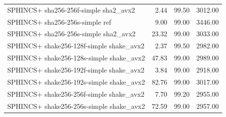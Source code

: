 \begin{tabular}{lrrr}
   SPHINCS+ sha256-256f-simple sha2_avx2 &                           2.44 &        99.50 &                            3012.00 \\
         SPHINCS+ sha256-256s-simple ref &                           9.00 &        99.00 &                            3446.00 \\
   SPHINCS+ sha256-256s-simple sha2_avx2 &                          23.32 &        99.00 &                            3033.00 \\
SPHINCS+ shake256-128f-simple shake_avx2 &                           2.37 &        99.50 &                            2982.00 \\
SPHINCS+ shake256-128s-simple shake_avx2 &                          47.83 &        99.00 &                            2989.00 \\
SPHINCS+ shake256-192f-simple shake_avx2 &                           3.84 &        99.00 &                            2918.00 \\
SPHINCS+ shake256-192s-simple shake_avx2 &                          82.76 &        99.00 &                            3017.00 \\
SPHINCS+ shake256-256f-simple shake_avx2 &                           7.70 &        99.20 &                            2955.00 \\
SPHINCS+ shake256-256s-simple shake_avx2 &                          72.59 &        99.00 &                            2957.00 \\
\bottomrule
\end{tabular}
